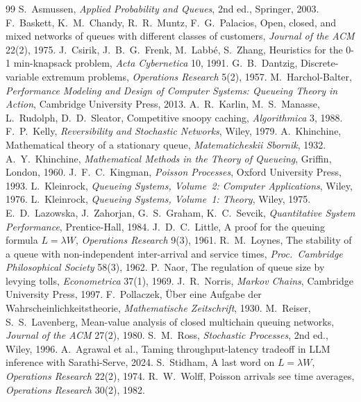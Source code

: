 \begin{thebibliography}{99}\small
{} S.~Asmussen, \emph{Applied Probability and Queues}, 2nd ed., Springer, 2003.
 F.~Baskett, K.~M.~Chandy, R.~R.~Muntz, F.~G.~Palacios, Open, closed, and mixed networks of queues with different classes of customers, \emph{Journal of the ACM} 22(2), 1975.
 J.~Csirik, J.~B.~G.~Frenk, M.~Labb\'e, S.~Zhang, Heuristics for the 0-1 min-knapsack problem, \emph{Acta Cybernetica} 10, 1991.
 G.~B.~Dantzig, Discrete-variable extremum problems, \emph{Operations Research} 5(2), 1957.
 M.~Harchol-Balter, \emph{Performance Modeling and Design of Computer Systems: Queueing Theory in Action}, Cambridge University Press, 2013.
 A.~R.~Karlin, M.~S.~Manasse, L.~Rudolph, D.~D.~Sleator, Competitive snoopy caching, \emph{Algorithmica} 3, 1988.
 F.~P.~Kelly, \emph{Reversibility and Stochastic Networks}, Wiley, 1979.
 A.~Khinchine, Mathematical theory of a stationary queue, \emph{Matematicheskii Sbornik}, 1932.
 A.~Y.~Khinchine, \emph{Mathematical Methods in the Theory of Queueing}, Griffin, London, 1960.
 J.~F.~C.~Kingman, \emph{Poisson Processes}, Oxford University Press, 1993.
 L.~Kleinrock, \emph{Queueing Systems, Volume~2: Computer Applications}, Wiley, 1976.
 L.~Kleinrock, \emph{Queueing Systems, Volume~1: Theory}, Wiley, 1975.
 E.~D.~Lazowska, J.~Zahorjan, G.~S.~Graham, K.~C.~Sevcik, \emph{Quantitative System Performance}, Prentice-Hall, 1984.
 J.~D.~C.~Little, A proof for the queuing formula $L=\lambda W$, \emph{Operations Research} 9(3), 1961.
 R.~M.~Loynes, The stability of a queue with non-independent inter-arrival and service times, \emph{Proc.\ Cambridge Philosophical Society} 58(3), 1962.
 P.~Naor, The regulation of queue size by levying tolls, \emph{Econometrica} 37(1), 1969.
 J.~R.~Norris, \emph{Markov Chains}, Cambridge University Press, 1997.
 F.~Pollaczek, \"Uber eine Aufgabe der Wahrscheinlichkeitstheorie, \emph{Mathematische Zeitschrift}, 1930.
 M.~Reiser, S.~S.~Lavenberg, Mean-value analysis of closed multichain queuing networks, \emph{Journal of the ACM} 27(2), 1980.
 S.~M.~Ross, \emph{Stochastic Processes}, 2nd ed., Wiley, 1996.
 A.~Agrawal et al., Taming throughput-latency tradeoff in LLM inference with Sarathi-Serve, 2024.
 S.~Stidham, A last word on $L=\lambda W$, \emph{Operations Research} 22(2), 1974.
 R.~W.~Wolff, Poisson arrivals see time averages, \emph{Operations Research} 30(2), 1982.
\end{thebibliography}
